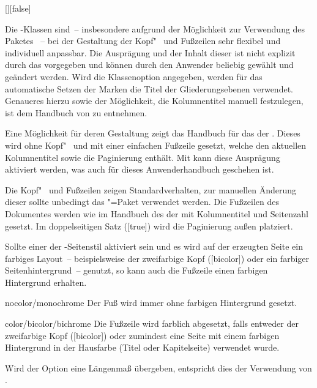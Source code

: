 \begin{Declaration}{[\PSet]}[false]%
\printdeclarationlist%
%

Die \TUDScript-Klassen sind~-- insbesondere aufgrund der Möglichkeit zur 
Verwendung des Paketes ~-- bei der Gestaltung der 
Kopf"~ und Fußzeilen sehr flexibel und individuell anpassbar. Die Ausprägung 
und der Inhalt dieser ist nicht explizit durch das \CD vorgegeben und können 
durch den Anwender beliebig gewählt und geändert werden. Wird die Klassenoption 
 angegeben, werden für das automatische Setzen der Marken die 
Titel der Gliederungsebenen verwendet. Genaueres hierzu sowie der Möglichkeit, 
die Kolumnentitel manuell festzulegen, ist dem Handbuch von \KOMAScript{} zu 
entnehmen.

Eine Möglichkeit für deren Gestaltung zeigt das Handbuch für das \CD der \TnUD. 
Dieses wird ohne Kopf"~ und mit einer einfachen Fußzeile gesetzt, welche den 
aktuellen Kolumnentitel sowie die Paginierung enthält. Mit  kann 
diese Ausprägung aktiviert werden, was auch für dieses Anwenderhandbuch 
geschehen ist.
%
\begin{values}
\itemfalse
  Die Kopf"~ und Fußzeilen zeigen Standardverhalten, zur manuellen Änderung 
  dieser sollte unbedingt das \KOMAScript"=Paket  
  verwendet werden.
\itemtrue*
  Die Fußzeilen des Dokumentes werden wie im Handbuch des \CDs der \TnUD 
  mit Kolumnentitel und Seitenzahl gesetzt. Im doppelseitigen Satz 
  ([true]) wird die Paginierung außen platziert.
\end{values}
%
Sollte einer der -Seitenstil aktiviert sein und es wird 
auf der erzeugten Seite ein farbiges Layout~--  beispielsweise der zweifarbige 
Kopf ([bicolor]) oder ein farbiger Seitenhintergrund~-- genutzt, 
so kann auch die Fußzeile einen farbigen Hintergrund erhalten.
%
\begin{values}
\item[nocolor/monochrome]
  Der Fuß wird immer ohne farbigen Hintergrund gesetzt.
\item[color/bicolor/bichrome]
  Die Fußzeile wird farblich abgesetzt, falls entweder der zweifarbige Kopf
  ([bicolor]) oder zumindest eine Seite mit einem farbigen 
  Hintergrund in der Hausfarbe (Titel oder Kapitelseite) verwendet wurde.
\end{values}
%
Wird der Option  eine Längenmaß übergeben, entspricht dies der 
Verwendung von .
\end{Declaration}

